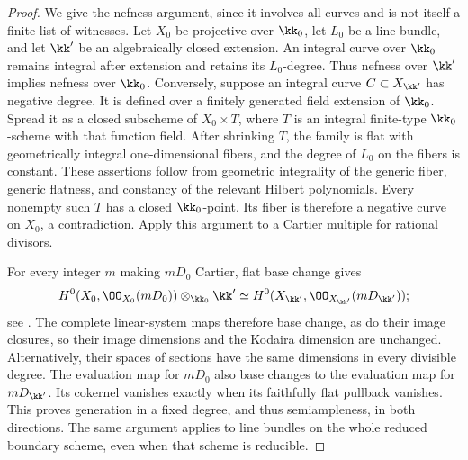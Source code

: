 \begin{proof}
We give the nefness argument, since it involves all curves and
is not itself a finite list of witnesses.  Let $X_0$ be projective
over $\kk_0$, let $L_0$ be a line bundle, and let $\kk'$ be an
algebraically closed extension.  An integral curve over $\kk_0$
remains integral after extension and retains its $L_0$-degree.
Thus nefness over $\kk'$ implies nefness over $\kk_0$.
Conversely, suppose an integral curve $C\subset X_{\kk'}$ has
negative degree.  It is defined over a finitely generated field
extension of $\kk_0$.  Spread it as a closed subscheme of
$X_0\times T$, where $T$ is an integral finite-type
$\kk_0$-scheme with that function field.  After shrinking $T$,
the family is flat with geometrically integral one-dimensional
fibers, and the degree of $L_0$ on the fibers is constant.  These
assertions follow from geometric integrality of the generic
fiber, generic flatness, and constancy of the relevant Hilbert
polynomials.  Every nonempty such $T$ has a closed
$\kk_0$-point.  Its fiber is therefore a negative curve on
$X_0$, a contradiction.  Apply this argument to a Cartier
multiple for rational divisors.

For every integer $m$ making $mD_0$ Cartier, flat base change
gives
\begin{equation}
 H^0(X_0,\OO_{X_0}(mD_0))\otimes_{\kk_0}\kk'
   \simeq H^0(X_{\kk'},\OO_{X_{\kk'}}(mD_{\kk'}));
 \label{bl:eq:fields-sections}
\end{equation}
see \cite[Tag~02KH]{StacksProject}.  The complete linear-system
maps therefore base change, as do their image closures, so their
image dimensions and the Kodaira dimension are unchanged.
Alternatively, their spaces of sections have the same dimensions
in every divisible degree.  The evaluation map for $mD_0$ also
base changes to the evaluation map for $mD_{\kk'}$.  Its
cokernel vanishes exactly when its faithfully flat pullback
vanishes.  This proves generation in a fixed degree, and thus
semiampleness, in both directions.  The same argument applies to
line bundles on the whole reduced boundary scheme, even when
that scheme is reducible.
\end{proof}

